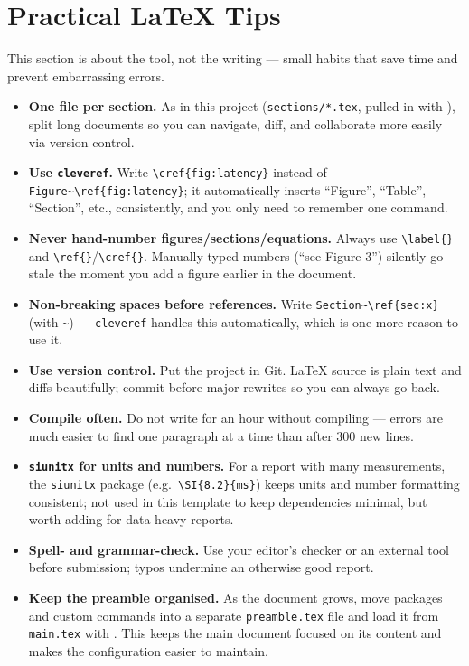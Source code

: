 \section{Practical \LaTeX{} Tips}
\label{sec:latex-tips}

This section is about the tool, not the writing --- small habits that
save time and prevent embarrassing errors.

\begin{itemize}
      \item \textbf{One file per section.} As in this project
            (\texttt{sections/*.tex}, pulled in with \verb||), split
            long documents so you can navigate, diff, and collaborate more
            easily via version control.
      \item \textbf{Use \texttt{cleveref}.} Write \verb|\cref{fig:latency}|
            instead of \verb|Figure~\ref{fig:latency}|; it automatically
            inserts ``Figure'', ``Table'', ``Section'', etc., consistently,
            and you only need to remember one command.
      \item \textbf{Never hand-number figures/sections/equations.} Always use
            \verb|\label{}| and \verb|\ref{}|/\verb|\cref{}|. Manually typed
            numbers (``see Figure 3'') silently go stale the moment you add a
            figure earlier in the document.
      \item \textbf{Non-breaking spaces before references.} Write
            \verb|Section~\ref{sec:x}| (with \verb|~|) --- \texttt{cleveref}
            handles this automatically, which is one more reason to use it.
      \item \textbf{Use version control.} Put the project in Git. \LaTeX{}
            source is plain text and diffs beautifully; commit before major
            rewrites so you can always go back.
      \item \textbf{Compile often.} Do not write for an hour without
            compiling --- errors are much easier to find one paragraph at a
            time than after 300 new lines.
      \item \textbf{\texttt{siunitx} for units and numbers.} For a
            report with many measurements, the \texttt{siunitx} package
            (e.g.\ \verb|\SI{8.2}{ms}|) keeps units and number formatting
            consistent; not used in this template to keep dependencies
            minimal, but worth adding for data-heavy reports.
      \item \textbf{Spell- and grammar-check.} Use your editor's checker or
            an external tool before submission; typos undermine an otherwise
            good report.
      \item \textbf{Keep the preamble organised.} As the document grows, move
      packages and custom commands into a separate \texttt{preamble.tex}
      file and load it from \texttt{main.tex} with \verb||. This keeps
      the main document focused on its content and makes the configuration
      easier to maintain.
\end{itemize}

